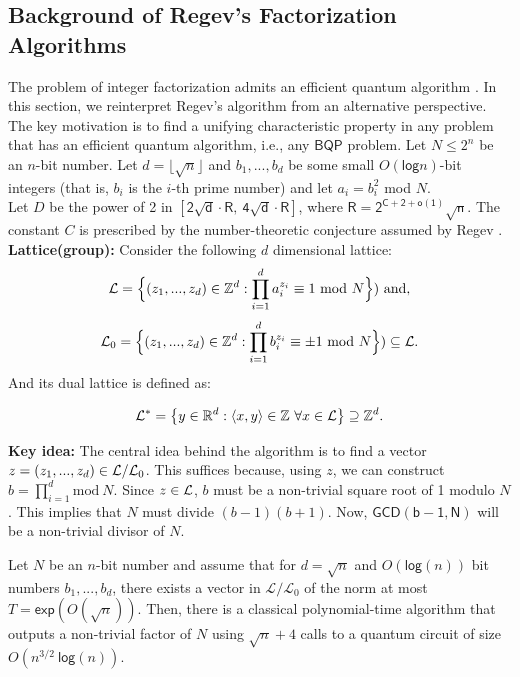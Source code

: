 \documentclass[11pt]{article}
\begin{document}
\subsection{Background of Regev's Factorization Algorithms}
The problem of integer factorization admits an efficient quantum algorithm \cite{shor1999polynomial, regev2025efficient}. In this section, we reinterpret Regev's algorithm from an alternative perspective. The key motivation is to find a unifying characteristic property in any problem that has an efficient quantum algorithm, i.e., any $\mathsf{BQP}$ problem. Let $N\leq 2^n$ be an $n$-bit number. Let $d=\lfloor\sqrt{n}\rfloor$ and $b_1,...,b_d$ be some small $O(\mathsf{log}n)$-bit integers (that is, $b_i$ is the $i$-th prime number) and let $a_i=b_i^2$ mod $N$.\\
Let $D$ be the power of 2 in $\mathsf{[2\sqrt{d}\cdot R,\ 4\sqrt{d}\cdot R]}$, where $\mathsf{R=2^{C+2+o(1)}\sqrt{n}}$. The constant $C$ is prescribed by the number-theoretic conjecture assumed by Regev \cite{regev2025efficient}.\newline
\\
\textbf{Lattice(group):} Consider the following $d$ dimensional lattice:
$$\LL=\Big\{ (z_1, ..., z_d)\in \mathbb{Z}^d : \prod_{i=1}^{d} a_i^{z_i}\equiv 1\  \textrm{mod}\ N  \Big\})\ \textrm{and},$$ 
$$\LL_0=\Big\{ (z_1, ..., z_d)\in \mathbb{Z}^d : \prod_{i=1}^{d} b_i^{z_i}\equiv  \pm 1\  \textrm{mod}\ N  \Big\})\subseteq \mathcal{L}.$$ 
And its dual lattice is defined as:

$$\mathcal{L}^* = \big\{y\in \mathbb{R}^d : \langle x,y\rangle\in \mathbb{Z}\  \forall x \in \mathcal{L}  \big\}\supseteq \mathbb{Z}^d.$$

\textbf{Key idea:} The central idea behind the \cite{regev2025efficient} algorithm is to find a vector $z=(z_1,...,z_d)\in \mathcal{L}/ \mathcal{L}_0$. This suffices because, using $z$, we can construct $b=\prod_{i=1}^d \textrm{mod}\ N$. Since $z\in \mathcal{L}$, $b$ must be a non-trivial square root of 1 modulo $N$. This implies that $N$ must divide $(b-1)(b+1)$. Now, $ \mathsf{GCD(b-1,N)} $ will be a non-trivial divisor of $N$.\\


\begin{theorem}
     Let $N$ be an $n$-bit number and assume that for $d=\sqrt{n}$ and $O(\mathsf{log}(n))$ bit numbers $b_1,...,b_d$, there exists a vector in $\mathcal{L}/\mathcal{L}_0$ of the norm at most $T=\mathsf{exp}(O(\sqrt{n}))$. Then, there is a classical polynomial-time algorithm that outputs a non-trivial factor of $N$ using $\sqrt{n}+4$ calls to a quantum circuit of size $O(n^{3/2}\ \mathsf{log}(n))$.
\end{theorem}
\end{document}
